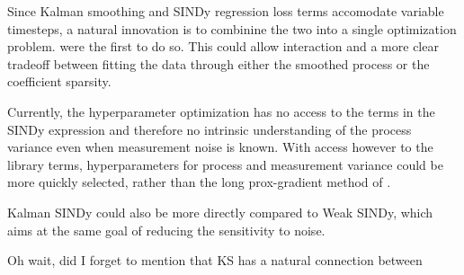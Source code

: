 \documentclass{article}
\begin{document}
Since Kalman smoothing and SINDy regression loss terms accomodate variable timesteps, a natural innovation is to combinine the two into a single optimization problem.  \cite{Hirsh2022} were the first to do so.  This could allow interaction and a more clear tradeoff between fitting the data through either the smoothed process or the coefficient sparsity.

Currently, the hyperparameter optimization has no access to the terms in the SINDy expression and therefore no intrinsic understanding of the process variance even when measurement noise is known.  With access however to the library terms, hyperparameters for process and measurement variance could be more quickly selected, rather than the long prox-gradient method of \cite{Barratt2020}.

Kalman SINDy could also be more directly compared to Weak SINDy, which aims at the same goal of reducing the sensitivity to noise.

Oh wait, did I forget to mention that KS has a natural connection between
\end{document}
